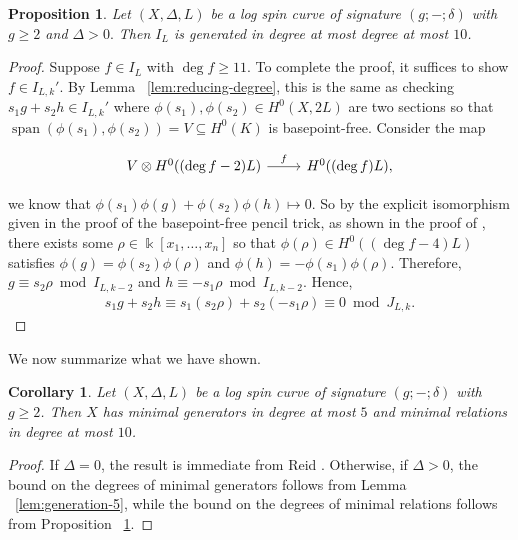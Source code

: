 \documentclass{amsart}
\theoremstyle{plain}
\newtheorem{prop}[thm]{Proposition}
\newtheorem{cor}[thm]{Corollary}
\theoremstyle{definition}
\theoremstyle{remark}
\numberwithin{equation}{section}
\newcommand\Bk{{\Bbbk}}
\newcommand{\halfcan}{L}
\DeclareMathOperator{\newspan}{span}
\begin{document}
\begin{prop}
\label{prop:relation-10}
Let $(X, \Delta, \halfcan)$ be a log spin curve of signature $(g; -; \delta)$
 with $g \geq 2$ and $\Delta > 0.$ Then $I_\halfcan$ is generated in
degree at most degree at most $10$.
\end{prop}
\begin{proof}
Suppose $f \in I_\halfcan$ with $\deg f \geq 11$. To complete the proof,
it suffices to show $f \in I_{\halfcan,k}'$. By Lemma
~\ref{lem:reducing-degree}, this is the same as checking $s_1 g + s_2 h \in
I_{\halfcan, k}'$ where $\phi(s_ 1), \phi(s_2) \in H^0(X, 2L)$ are two sections
so that $\newspan(\phi(s_ 1), \phi(s_2)) = V \subseteq H^0(K)$ is
basepoint-free. Consider the map

$$\begin{tikzcd}
V \otimes H^0((\deg f - 2)L) \ar {r}{f} & H^0((\deg f)L),
\end{tikzcd}$$

\noindent
we know that $\phi(s_1)\phi(g) + \phi(s_2) \phi(h) \mapsto 0$.
So by the explicit isomorphism given in the proof of the
basepoint-free pencil trick, as shown in the proof of \cite[Lemma 2.6]
{saint-donat:proj}, there exists some $\rho \in \Bk[x_1, \ldots, x_n]$
so that $\phi(\rho) \in H^0((\deg f - 4)L)$ satisfies $\phi(g) =
\phi(s_2) \phi(\rho)$ and $\phi(h) = -\phi(s_1)\phi(\rho)$. 
Therefore,
$g \equiv s_2 \rho \bmod I_{\halfcan, k-2}$ and $h \equiv - s_1 \rho \bmod
I_{\halfcan, k - 2}$. Hence,
\begin{align*}
	s_1g + s_2h \equiv s_1(s_2\rho) + s_2(-s_1 \rho) \equiv 0 \bmod J_
{L,k}.
\end{align*}
\end{proof}

We now summarize what we have shown.

\begin{cor}
\label{cor:g-2-presentation-bound}
Let $(X, \Delta, L)$ be a log spin curve of signature $(g; -;\delta)$
with $g \geq 2$. Then $X$ has minimal generators in degree at most
$5$ and minimal relations in degree at most $10$.
\end{cor}

\begin{proof}
If $\Delta = 0$, the result is immediate from Reid \cite[Theorem 3.4]
{reid:infinitesimal}. Otherwise, if $\Delta > 0$, the bound on the
degrees of minimal generators follows from Lemma
~\ref{lem:generation-5}, while the bound on the degrees of minimal
relations follows from Proposition ~\ref{prop:relation-10}.
\end{proof}
\end{document}
